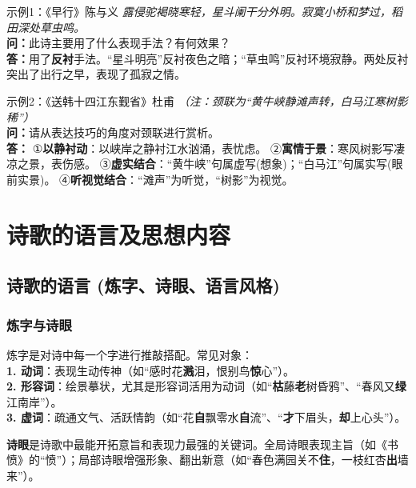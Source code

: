 \documentclass[11pt, a4paper]{ctexart}
\begin{document}
\begin{examplebox}{示例1：《早行》陈与义}
\textit{露侵驼褐晓寒轻，星斗阑干分外明。寂寞小桥和梦过，稻田深处草虫鸣。}\\
\textbf{问：}此诗主要用了什么表现手法？有何效果？\\
\textbf{答：}用了\textbf{反衬}手法。“星斗明亮”反衬夜色之暗；“草虫鸣”反衬环境寂静。两处反衬突出了出行之早，表现了孤寂之情。
\end{examplebox}

\begin{examplebox}{示例2：《送韩十四江东觐省》杜甫}
\textit{（注：颈联为“黄牛峡静滩声转，白马江寒树影稀”）}\\
\textbf{问：}请从表达技巧的角度对颈联进行赏析。\\
\textbf{答：}
①\textbf{以静衬动}：以峡岸之静衬江水汹涌，表忧虑。
②\textbf{寓情于景}：寒风树影写凄凉之景，表伤感。
③\textbf{虚实结合}：“黄牛峡”句属虚写(想象)；“白马江”句属实写(眼前实景)。
④\textbf{听视觉结合}：“滩声”为听觉，“树影”为视觉。
\end{examplebox}

\section{诗歌的语言及思想内容}

\subsection{诗歌的语言 (炼字、诗眼、语言风格)}

\subsubsection{炼字与诗眼}
炼字是对诗中每一个字进行推敲搭配。常见对象：\\
\textbf{1. 动词}：表现生动传神（如“感时花\textbf{溅}泪，恨别鸟\textbf{惊}心”）。\\
\textbf{2. 形容词}：绘景摹状，尤其是形容词活用为动词（如“\textbf{枯}藤\textbf{老}树昏鸦”、“春风又\textbf{绿}江南岸”）。\\
\textbf{3. 虚词}：疏通文气、活跃情韵（如“花\textbf{自}飘零水\textbf{自}流”、“\textbf{才}下眉头，\textbf{却}上心头”）。

\textbf{诗眼}是诗歌中最能开拓意旨和表现力最强的关键词。全局诗眼表现主旨（如《书愤》的“愤”）；局部诗眼增强形象、翻出新意（如“春色满园关不\textbf{住}，一枝红杏\textbf{出}墙来”）。
\end{document}
